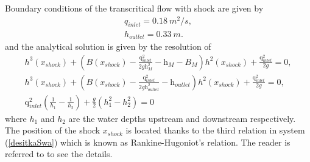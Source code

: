 Boundary conditions of the transcritical flow with shock are given by 
\begin{equation}
\begin{array}{c}
q_{inlet}=0.18 \ m^2/s,\\
h_{outlet}=0.33 \ m.
\end{array}
\end{equation}
and the analytical solution is given by the resolution of
\begin{equation}\label{desitkaSwa}
\begin{array}{r}
h^3(x _{shock})+\left( B(x _{shock})-\frac{\text{q} ^2_{inlet} }{2g \text{h}^2_M}-\text{h}_M-B_M \right)h^2(x_{shock})+\frac{\text{q} ^2_{inlet}}{2g}=0,\\

h^3(x _{shock})+\left( B(x _{shock})-\frac{\text{q} ^2_{inlet} }{2g \text{h}^2_{outlet}}-\text{h}_{outlet} \right)h^2(x_{shock})+\frac{\text{q} ^2_{inlet}}{2g}=0,\\
\text{q} ^2_{inlet}\left(\frac{1}{h_1}-\frac{1}{h_2}\right)+\frac{g}{2}(h_1^2-h_2^2)=0
\end{array}
\end{equation}
where $h_1$ and $h_2$ are the water depths upstream and downstream respectively. The position of the shock $x_{shock}$ is located thanks to the third relation in system (\ref{desitkaSwa}) which is known as Rankine-Hugoniot’s relation. The reader is referred to \cite{noelle} to see the details.
